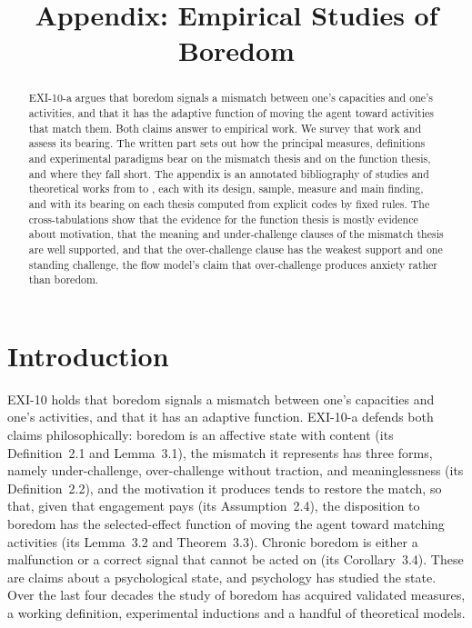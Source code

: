 \documentclass{situationist-preprint}
\title{Appendix: Empirical Studies of Boredom}
\begin{document}
\maketitle

\begin{abstract}
EXI-10-a argues that boredom signals a mismatch between one's capacities and one's activities, and that it has the adaptive function of moving the agent toward activities that match them. Both claims answer to empirical work. We survey that work and assess its bearing. The written part sets out how the principal measures, definitions and experimental paradigms bear on the mismatch thesis and on the function thesis, and where they fall short. The appendix is an annotated bibliography of \stn{} studies and theoretical works from \stymin{} to \stymax{}, each with its design, sample, measure and main finding, and with its bearing on each thesis computed from explicit codes by fixed rules. The cross-tabulations show that the evidence for the function thesis is mostly evidence about motivation, that the meaning and under-challenge clauses of the mismatch thesis are well supported, and that the over-challenge clause has the weakest support and one standing challenge, the flow model's claim that over-challenge produces anxiety rather than boredom.
\end{abstract}

\section{Introduction}

EXI-10 holds that boredom signals a mismatch between one's capacities and one's activities, and that it has an adaptive function. EXI-10-a defends both claims philosophically: boredom is an affective state with content (its Definition~2.1 and Lemma~3.1), the mismatch it represents has three forms, namely under-challenge, over-challenge without traction, and meaninglessness (its Definition~2.2), and the motivation it produces tends to restore the match, so that, given that engagement pays (its Assumption~2.4), the disposition to boredom has the selected-effect function of moving the agent toward matching activities (its Lemma~3.2 and Theorem~3.3). Chronic boredom is either a malfunction or a correct signal that cannot be acted on (its Corollary~3.4). These are claims about a psychological state, and psychology has studied the state. Over the last four decades the study of boredom has acquired validated measures, a working definition, experimental inductions and a handful of theoretical models.
\end{document}
